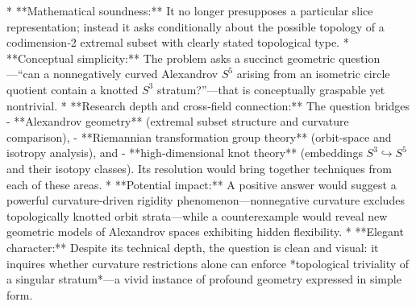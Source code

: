 * **Mathematical soundness:** It no longer presupposes a particular slice representation; instead it asks conditionally about the possible topology of a codimension‑2 extremal subset with clearly stated topological type.  
* **Conceptual simplicity:** The problem asks a succinct geometric question—“can a nonnegatively curved Alexandrov \( S^5 \) arising from an isometric circle quotient contain a knotted \( S^3 \) stratum?”—that is conceptually graspable yet nontrivial.  
* **Research depth and cross‑field connection:** The question bridges  
  - **Alexandrov geometry** (extremal subset structure and curvature comparison),  
  - **Riemannian transformation group theory** (orbit‑space and isotropy analysis), and  
  - **high‑dimensional knot theory** (embeddings \( S^3 \hookrightarrow S^5 \) and their isotopy classes).  
  Its resolution would bring together techniques from each of these areas.  
* **Potential impact:** A positive answer would suggest a powerful curvature‑driven rigidity phenomenon—nonnegative curvature excludes topologically knotted orbit strata—while a counterexample would reveal new geometric models of Alexandrov spaces exhibiting hidden flexibility.  
* **Elegant character:** Despite its technical depth, the question is clean and visual: it inquires whether curvature restrictions alone can enforce *topological triviality of a singular stratum*—a vivid instance of profound geometry expressed in simple form.